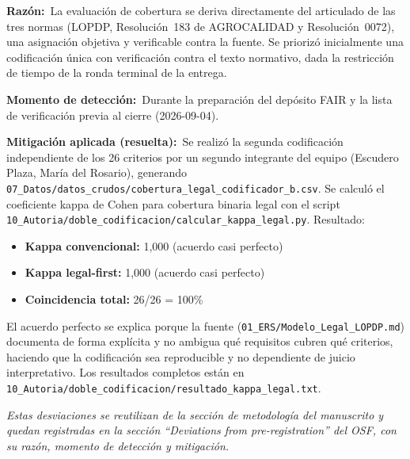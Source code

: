\documentclass[11pt,a4paper]{article}
\begin{document}
\textbf{Raz\'{o}n:}~La evaluaci\'{o}n de cobertura se deriva directamente del
articulado de las tres normas (LOPDP, Resoluci\'{o}n~183 de AGROCALIDAD y
Resoluci\'{o}n~0072), una asignaci\'{o}n objetiva y verificable contra la fuente.
Se prioriz\'{o} inicialmente una codificaci\'{o}n \'{u}nica con verificaci\'{o}n
contra el texto normativo, dada la restricci\'{o}n de tiempo de la ronda terminal
de la entrega.

\textbf{Momento de detecci\'{o}n:}~Durante la preparaci\'{o}n del dep\'{o}sito
FAIR y la lista de verificaci\'{o}n previa al cierre (2026-09-04).

\textbf{Mitigaci\'{o}n aplicada (resuelta):}~Se realiz\'{o} la segunda
codificaci\'{o}n independiente de los 26 criterios por un segundo integrante del
equipo (Escudero Plaza, Mar\'{i}a del Rosario), generando
\texttt{07\_Datos/datos\_crudos/cobertura\_legal\_codificador\_b.csv}. Se
calcul\'{o} el coeficiente kappa de Cohen para cobertura binaria legal con el
script
\texttt{10\_Autoria/doble\_codificacion/calcular\_kappa\_legal.py}. Resultado:

\begin{itemize}[nosep]
  \item \textbf{Kappa convencional:} 1,000 (acuerdo casi perfecto)
  \item \textbf{Kappa legal-first:} 1,000 (acuerdo casi perfecto)
  \item \textbf{Coincidencia total:} 26/26 = 100\%
\end{itemize}

El acuerdo perfecto se explica porque la fuente
(\texttt{01\_ERS/Modelo\_Legal\_LOPDP.md}) documenta de forma expl\'{i}cita y
no ambigua qu\'{e} requisitos cubren qu\'{e} criterios, haciendo que la
codificaci\'{o}n sea reproducible y no dependiente de juicio interpretativo. Los
resultados completos est\'{a}n en
\texttt{10\_Autoria/doble\_codificacion/resultado\_kappa\_legal.txt}.

\vfill

\begin{center}
\small\textit{Estas desviaciones se reutilizan de la secci\'{o}n de
metodolog\'{i}a del manuscrito y quedan registradas en la secci\'{o}n
``Deviations from pre-registration'' del OSF, con su raz\'{o}n, momento de
detecci\'{o}n y mitigaci\'{o}n.}
\end{center}
\end{document}
